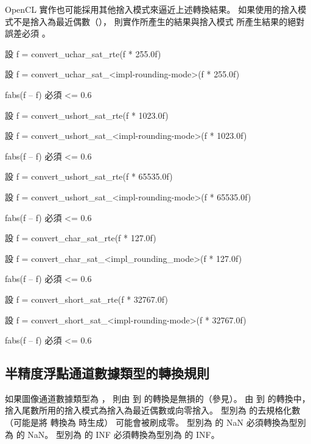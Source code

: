 OpenCL 實作也可能採用其他捨入模式來逼近上述轉換結果。
如果使用的捨入模式不是捨入為最近偶數（），
則實作所產生的結果與捨入模式  所產生結果的絕對誤差必須 。

設 f = convert_uchar_sat_rte(f * 255.0f)

設 f = convert_uchar_sat_<impl-rounding-mode>(f * 255.0f)

fabs(f – f) 必須 <= 0.6
\stopclCmmDesc

設 f = convert_ushort_sat_rte(f * 1023.0f)

設 f = convert_ushort_sat_<impl-rounding-mode>(f * 1023.0f)

fabs(f – f) 必須 <= 0.6
\stopclCmmDesc

設 f = convert_ushort_sat_rte(f * 65535.0f)

設 f = convert_ushort_sat_<impl-rounding-mode>(f * 65535.0f)

fabs(f – f) 必須 <= 0.6
\stopclCmmDesc

設 f = convert_char_sat_rte(f * 127.0f)

設 f = convert_char_sat_<impl_rounding_mode>(f * 127.0f)

fabs(f – f) 必須 <= 0.6
\stopclCmmDesc

設 f = convert_short_sat_rte(f * 32767.0f)

設 f = convert_short_sat_<impl-rounding-mode>(f * 32767.0f)

fabs(f – f) 必須 <= 0.6
\stopclCmmDesc

\subsection{半精度浮點通道數據類型的轉換規則}

如果圖像通道數據類型為 ，
則由  到  的轉換是無損的（參見\insection[dataTypeHalf]）。
由  到  的轉換中，
捨入尾數所用的捨入模式為捨入為最近偶數或向零捨入。
型別為  的去規格化數（可能是將  轉換為  時生成）
可能會被刷成零。
型別為  的 NaN 必須轉換為型別為  的 NaN。
型別為  的 INF 必須轉換為型別為  的 INF。

